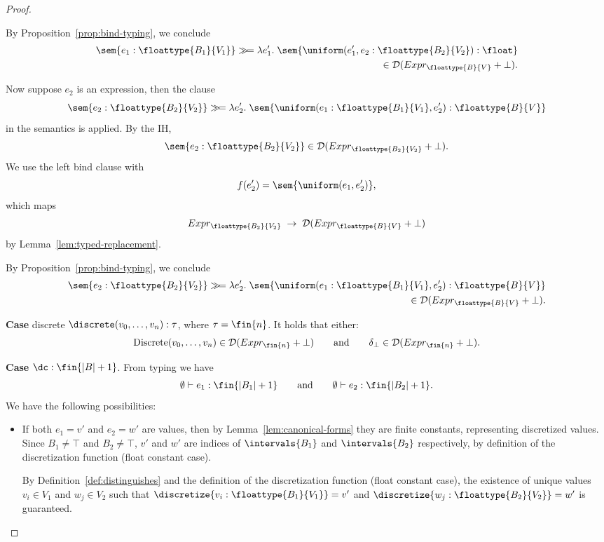 \begin{proof}
\begin{itemize}
		By Proposition~\ref{prop:bind-typing}, we conclude
		\begin{align*}
			\sem{e_1 : \floattype{B_1}{V_1}} \gg\!= \lambda e_1'.\;
			\sem{\uniform(e_1',e_2 : \floattype{B_2}{V_2}) : \float} \\
			\in \mathcal{D}(Expr_{\floattype{B}{V}} + \bot).
		\end{align*}

		Now suppose $e_2$ is an expression, then the clause
		\[
			\sem{e_2 : \floattype{B_2}{V_2}} \gg\!= \lambda e_2'.\;
			\sem{\uniform(e_1 : \floattype{B_1}{V_1}, e_2') : \floattype{B}{V}}
		\]
		in the semantics is applied. By the IH,
		\[
			\sem{e_2 : \floattype{B_2}{V_2}} \in \mathcal{D}(Expr_{\floattype{B_2}{V_2}} + \bot).
		\]
		We use the left bind clause with 
		\[
			f(e_2') = \sem{\uniform(e_1,e_2')},
		\]
		which maps
		\[
			Expr_{\floattype{B_2}{V_2}} \;\to\; \mathcal{D}(Expr_{\floattype{B}{V}} + \bot)
		\]
		by Lemma~\ref{lem:typed-replacement}. 

		By Proposition~\ref{prop:bind-typing}, we conclude
		\begin{align*}
			\sem{e_2 : \floattype{B_2}{V_2}} \gg\!= \lambda e_2'.\;
			\sem{\uniform(e_1 : \floattype{B_1}{V_1}, e_2') : \floattype{B}{V}} \\
			\in \mathcal{D}(Expr_{\floattype{B}{V}} + \bot).
		\end{align*}
		\end{itemize}

		\textbf{Case} discrete $\discrete(v_0, \ldots, v_n) : \tau$, where $\tau = \fin{n}$. It holds that either:
		\[
			\text{Discrete}(v_0,\ldots,v_n) \in \mathcal{D}(Expr_{\fin{n}} + \bot)
			\qquad\text{and}\qquad
			\delta_{\bot} \in \mathcal{D}(Expr_{\fin{n}} + \bot).
		\]

		\textbf{Case} $\dc : \fin{|B| + 1}$. From typing we have
		\[
			\emptyset \vdash e_1 : \fin{|B_1| + 1} 
			\qquad\text{and}\qquad 
			\emptyset \vdash e_2 : \fin{|B_2| + 1}.
		\]  
		We have the following possibilities:
		\begin{itemize}
			\item If both $e_1 = v'$ and $e_2 = w'$ are values, then by Lemma~\ref{lem:canonical-forms} they are finite constants, representing discretized values. Since $B_1 \neq \top$ and $B_2 \neq \top$, $v'$ and $w'$ are indices of $\intervals{B_1}$ and $\intervals{B_2}$ respectively, by definition of the discretization function (float constant case).

			By Definition~\ref{def:distinguishes} and the definition of the discretization function (float constant case), the existence of unique values $v_i \in V_1$ and $w_j \in V_2$ such that $\discretize{v_i : \floattype{B_1}{V_1}} = v'$ and $\discretize{w_j : \floattype{B_2}{V_2}} = w'$ is guaranteed.


\end{itemize}
\end{proof}
